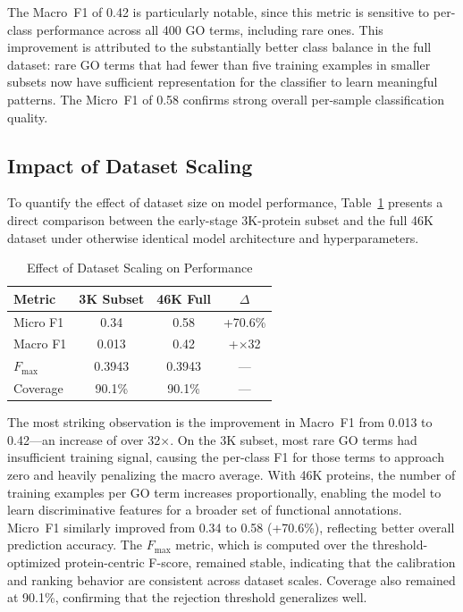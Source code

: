 \documentclass[conference]{IEEEtran}
\begin{document}
The Macro~F1 of 0.42 is particularly notable, since this metric is sensitive to per-class performance across all 400 GO terms, including rare ones. This improvement is attributed to the substantially better class balance in the full dataset: rare GO terms that had fewer than five training examples in smaller subsets now have sufficient representation for the classifier to learn meaningful patterns. The Micro~F1 of 0.58 confirms strong overall per-sample classification quality.

\subsection{Impact of Dataset Scaling}

To quantify the effect of dataset size on model performance, Table~\ref{tab:scaling} presents a direct comparison between the early-stage 3K-protein subset and the full 46K dataset under otherwise identical model architecture and hyperparameters.

\begin{table}[t]
\centering
\caption{Effect of Dataset Scaling on Performance}
\label{tab:scaling}
\begin{tabular}{@{}lccc@{}}
\toprule
\textbf{Metric} & \textbf{3K Subset} & \textbf{46K Full} & \textbf{$\Delta$} \\
\midrule
Micro F1 & 0.34 & 0.58 & +70.6\% \\
Macro F1 & 0.013 & 0.42 & +$\times$32 \\
$F_{\max}$ & 0.3943 & 0.3943 & --- \\
Coverage & 90.1\% & 90.1\% & --- \\
\bottomrule
\end{tabular}
\end{table}

The most striking observation is the improvement in Macro~F1 from 0.013 to 0.42---an increase of over 32$\times$. On the 3K subset, most rare GO terms had insufficient training signal, causing the per-class F1 for those terms to approach zero and heavily penalizing the macro average. With 46K proteins, the number of training examples per GO term increases proportionally, enabling the model to learn discriminative features for a broader set of functional annotations. Micro~F1 similarly improved from 0.34 to 0.58 (+70.6\%), reflecting better overall prediction accuracy. The $F_{\max}$ metric, which is computed over the threshold-optimized protein-centric F-score, remained stable, indicating that the calibration and ranking behavior are consistent across dataset scales. Coverage also remained at 90.1\%, confirming that the rejection threshold generalizes well.
\end{document}
